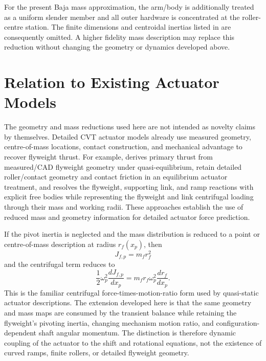 \documentclass[11pt]{report}
\numberwithin{equation}{section}
\begin{document}
For the present Baja mass approximation, the arm/body is additionally treated
as a uniform slender member and all outer hardware is concentrated at the
roller-centre station. The finite dimensions and centroidal inertias listed in
 are consequently omitted. A higher
fidelity mass description may replace this reduction without changing the
geometry or dynamics developed above.

\section{Relation to Existing Actuator Models}
\label{app:flyweight_classical_context}

The geometry and mass reductions used here are not intended as novelty claims by
themselves. Detailed CVT actuator models already use measured geometry,
centre-of-mass locations, contact construction, and mechanical advantage to
recover flyweight thrust. For example, \citet{Messick2018} derives primary
thrust from measured/CAD flyweight geometry under quasi-equilibrium,
\citet{KimEtAl2002} retain detailed roller/contact geometry and contact friction
in an equilibrium actuator treatment, and \citet{Skinner2020} resolves the
flyweight, supporting link, and ramp reactions with explicit free bodies while
representing the flyweight and link centrifugal loading through their mass and
working radii. These approaches establish the use of reduced mass and geometry
information for detailed actuator force prediction.

If the pivot inertia is neglected and the mass distribution is reduced to a
point or centre-of-mass description at radius \(r_f(x_p)\), then
\begin{equation}
    J_{f,p}=m_fr_f^2
\end{equation}
and the centrifugal term reduces to
\begin{equation}
    \boxed{
    \frac{1}{2}\omega_p^2\frac{dJ_{f,p}}{dx_p}
    =
    m_fr_f\omega_p^2\frac{dr_f}{dx_p}.
    }
    \label{eq:appB_classical_point_mass_limit}
\end{equation}
This is the familiar centrifugal force-times-motion-ratio form used by
quasi-static actuator descriptions. The extension developed here is that the
same geometry and mass maps are consumed by the transient balance while
retaining the flyweight's pivoting inertia, changing mechanism motion ratio,
and configuration-dependent shaft angular momentum. The distinction is
therefore dynamic coupling of the actuator to the shift and rotational
equations, not the existence of curved ramps, finite rollers, or detailed
flyweight geometry.
\end{document}
